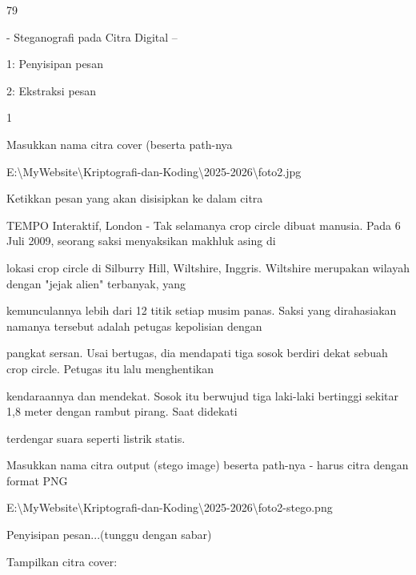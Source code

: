 \documentclass{article}
\begin{document}

79

- Steganografi pada Citra Digital --

1: Penyisipan pesan

2: Ekstraksi pesan

 1

Masukkan nama citra cover (beserta path-nya

 E:\textbackslash{}MyWebsite\textbackslash{}Kriptografi-dan-Koding\textbackslash{}2025-2026\textbackslash{}foto2.jpg

Ketikkan pesan yang akan disisipkan ke dalam citra

 TEMPO Interaktif, London - Tak selamanya crop circle dibuat manusia. Pada 6 Juli 2009, seorang saksi menyaksikan makhluk asing di 

lokasi crop circle di Silburry Hill, Wiltshire, Inggris. Wiltshire merupakan wilayah dengan "jejak alien" terbanyak, yang  

kemunculannya lebih dari 12 titik setiap musim panas.  Saksi yang dirahasiakan namanya tersebut adalah petugas kepolisian dengan 

pangkat sersan. Usai bertugas, dia mendapati tiga sosok  berdiri dekat sebuah crop circle.  Petugas itu lalu menghentikan 

kendaraannya dan mendekat. Sosok itu berwujud tiga laki-laki bertinggi sekitar 1,8 meter dengan  rambut pirang. Saat didekati 

terdengar suara seperti listrik statis. 

Masukkan nama citra output (stego image) beserta path-nya  - harus citra dengan format PNG

 E:\textbackslash{}MyWebsite\textbackslash{}Kriptografi-dan-Koding\textbackslash{}2025-2026\textbackslash{}foto2-stego.png

Penyisipan pesan...(tunggu dengan sabar)

Tampilkan citra cover:
\end{document}

